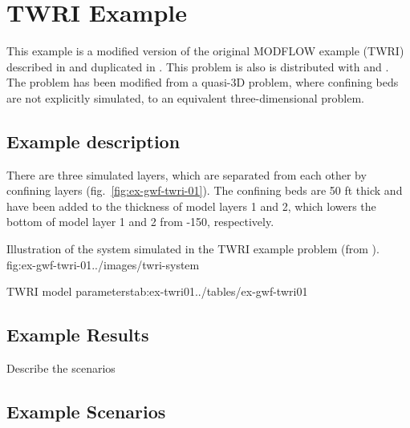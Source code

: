 \section{\mf TWRI Example}

This example is a modified version of the original MODFLOW example (TWRI) described in \cite{modflow88} and duplicated in \cite{harbaugh1996user}. This problem is also is distributed with \mff \citep{modflow2005} and \mf \citep{modflow6software}. The problem has been modified from a quasi-3D problem, where confining beds are not explicitly simulated, to an equivalent three-dimensional problem.

\subsection{Example description}
There are three simulated layers, which are separated from each other by confining layers (fig.~\ref{fig:ex-gwf-twri-01}). The confining beds are 50 ft thick and have been added to the thickness of model layers 1 and 2, which lowers the bottom of model layer 1 and 2 from -150, respectively. 

\begin{StandardFigure}{
                                     Illustration of the system simulated in the TWRI example problem (from \cite{modflow88}).
                                     }{fig:ex-gwf-twri-01}{../images/twri-system}
\end{StandardFigure}                                 






\begin{StandardTable}{TWRI model parameters}{tab:ex-twri01}{../tables/ex-gwf-twri01}
\end{StandardTable}

\subsection{Example Results}

Describe the scenarios

\subsection{Example Scenarios}

